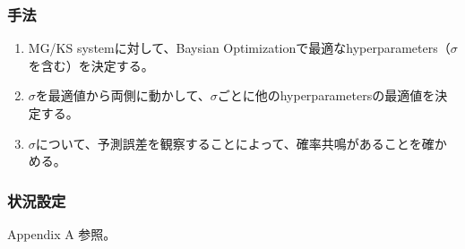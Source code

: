 \subsubsection{手法}
\begin{enumerate}
  \item MG/KS systemに対して、Baysian Optimizationで最適なhyperparameters（$\sigma$を含む）を決定する。
  \item $\sigma$を最適値から両側に動かして、$\sigma$ごとに他のhyperparametersの最適値を決定する。
  \item $\sigma$について、予測誤差を観察することによって、確率共鳴があることを確かめる。
\end{enumerate}
\clearpage


\subsubsection{状況設定}
Appendix A 参照。
